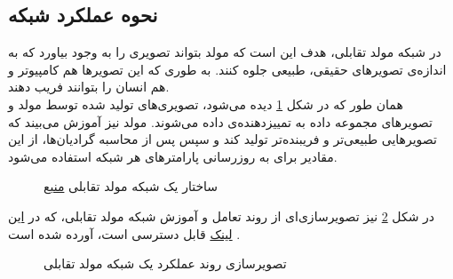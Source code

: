 \subsection{نحوه عملکرد شبکه}
در شبکه مولد تقابلی، هدف این است که مولد بتواند تصویری را به وجود بیاورد که به اندازه‌ی تصویر‌های حقیقی، طبیعی جلوه کنند. به طوری که این تصویر‌ها هم کامپیوتر و هم انسان را بتوانند فریب دهند.
\\
همان طور که در شکل 
\ref{ganArch}
دیده می‌شود، تصویری‌های تولید شده توسط مولد و تصویر‌های مجموعه داده به تمییزدهنده‌ی داده می‌شوند. مولد نیز آموزش می‌بیند که تصویر‌هایی طبیعی‌تر و فریبنده‌تر تولید کند و سپس پس از محاسبه گرادیان‌ها، از این مقادیر برای به روزرسانی پارامترهای هر شبکه استفاده می‌شود.
\begin{figure}[H]
	\caption{ساختار یک شبکه مولد تقابلی
		\href{https://bytes860770954.wordpress.com/2020/08/22/what-are-generative-adversarial-networks-gans/}{منبع}}
	\label{ganArch}
\end{figure}

در شکل
\ref{ganlab}
نیز تصویر‌سازی‌ای از روند تعامل و آموزش شبکه مولد تقابلی، که در
 \href{https://poloclub.github.io/ganlab/}{این لینک} 
قابل دسترسی است، آورده شده است .
\begin{figure}[H]
	\caption{تصویرسازی روند عملکرد یک شبکه مولد تقابلی}
	\label{ganlab}
\end{figure}
